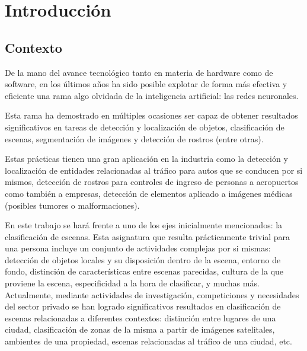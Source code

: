 
\section{Introducción}
\subsection{Contexto}
De la mano del avance tecnológico tanto en materia de hardware como de software, en los últimos años ha sido posible explotar de forma más efectiva y eficiente una rama algo olvidada de la inteligencia artificial: las redes neuronales.


Esta rama ha demostrado en múltiples ocasiones ser capaz de obtener resultados significativos en tareas de detección y localización de objetos, clasificación de escenas, segmentación de imágenes y detección de rostros (entre otras). 



Estas prácticas tienen una gran aplicación en la industria como la detección y localización de entidades relacionadas al tráfico para autos que se conducen por si mismos, detección de rostros para controles de ingreso de personas a aeropuertos como también a empresas, detección de elementos aplicado a imágenes médicas (posibles tumores o malformaciones).



En este trabajo se hará frente a uno de los ejes inicialmente mencionados: la clasificación de escenas. Esta asignatura que resulta prácticamente trivial para una persona incluye un conjunto de actividades complejas por si mismas: detección de objetos locales y su disposición dentro de la escena, entorno de fondo, distinción de características entre escenas parecidas, cultura de la que proviene la escena, especificidad a la hora de clasificar, y muchas más. Actualmente, mediante actividades de investigación, competiciones y necesidades del sector privado se han logrado significativos resultados en clasificación de escenas relacionadas a diferentes contextos: distinción entre lugares de una ciudad, clasificación de zonas de la misma a partir de imágenes satelitales, ambientes de una propiedad, escenas relacionadas al tráfico de una ciudad, etc.

